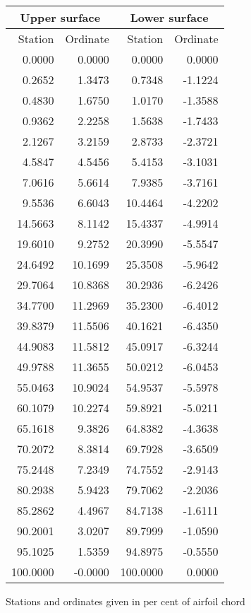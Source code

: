 \documentclass[11pt]{book}
\begin{document}
 \hspace{4mm}
 \begin{tabular}{|r|r|r|r|} \hline 
 \multicolumn{2}{|c|}{Upper surface} & \multicolumn{2}{|c|}{Lower surface} \\
 \hline
 Station & Ordinate & Station & Ordinate \\
 \hline
0.0000 & 0.0000 & 0.0000 & 0.0000 \\
0.2652 & 1.3473 & 0.7348 & -1.1224 \\
0.4830 & 1.6750 & 1.0170 & -1.3588 \\
0.9362 & 2.2258 & 1.5638 & -1.7433 \\
2.1267 & 3.2159 & 2.8733 & -2.3721 \\
4.5847 & 4.5456 & 5.4153 & -3.1031 \\
7.0616 & 5.6614 & 7.9385 & -3.7161 \\
9.5536 & 6.6043 & 10.4464 & -4.2202 \\
14.5663 & 8.1142 & 15.4337 & -4.9914 \\
19.6010 & 9.2752 & 20.3990 & -5.5547 \\
24.6492 & 10.1699 & 25.3508 & -5.9642 \\
29.7064 & 10.8368 & 30.2936 & -6.2426 \\
34.7700 & 11.2969 & 35.2300 & -6.4012 \\
39.8379 & 11.5506 & 40.1621 & -6.4350 \\
44.9083 & 11.5812 & 45.0917 & -6.3244 \\
49.9788 & 11.3655 & 50.0212 & -6.0453 \\
55.0463 & 10.9024 & 54.9537 & -5.5978 \\
60.1079 & 10.2274 & 59.8921 & -5.0211 \\
65.1618 & 9.3826 & 64.8382 & -4.3638 \\
70.2072 & 8.3814 & 69.7928 & -3.6509 \\
75.2448 & 7.2349 & 74.7552 & -2.9143 \\
80.2938 & 5.9423 & 79.7062 & -2.2036 \\
85.2862 & 4.4967 & 84.7138 & -1.6111 \\
90.2001 & 3.0207 & 89.7999 & -1.0590 \\
95.1025 & 1.5359 & 94.8975 & -0.5550 \\
100.0000 & -0.0000 & 100.0000 & 0.0000 \\
 \hline 
 \end{tabular}
 \vspace{8mm}

Stations and ordinates given in per cent of airfoil chord
\end{document}
